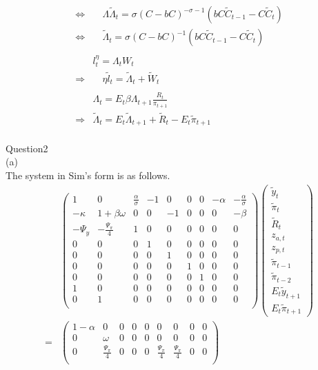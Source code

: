 \documentclass{article}
\begin{document}
\begin{CJK}{UTF8}{min}
\begin{align*}
    \Leftrightarrow & \quad \Lambda \tilde{\Lambda}_t=\sigma(C-bC)^{-\sigma-1}(bC\tilde{C}_{t-1}-C\tilde{C}_t) \\
    \Leftrightarrow & \quad \tilde{\Lambda}_t=\sigma(C-bC)^{-1}(bC\tilde{C}_{t-1}-C\tilde{C}_t) \\\\
    &l^\eta_{t}=\Lambda_{t}W_{t} \\
    \Rightarrow & \quad \eta\tilde{l}_t=\tilde{\Lambda}_t+\tilde{W}_t \\\\
    &\Lambda_{t}=E_t\beta\Lambda_{t+1}\frac{R_t}{\pi_{t+1}} \\
    \Rightarrow & \tilde\Lambda_t=E_t\tilde\Lambda_{t+1}+\tilde R_t-E_t\tilde \pi_{t+1}
\end{align*}\\
\qquad Question2\\
(a)\\
The system in Sim's form is as follows.
\begin{align*}
&\begin{pmatrix}1&0&\frac{\alpha}{\sigma}&-1&0&0&0&-\alpha&-\frac{\alpha}{\sigma}\\
-\kappa&1+\beta\omega&0&0&-1&0&0&0&-\beta\\
-\Psi_y&-\frac{\Psi_\pi}{4}&1&0&0&0&0&0&0\\
0&0&0&1&0&0&0&0&0\\
0&0&0&0&1&0&0&0&0\\
0&0&0&0&0&1&0&0&0\\
0&0&0&0&0&0&1&0&0\\
1&0&0&0&0&0&0&0&0\\
0&1&0&0&0&0&0&0&0\\
\end{pmatrix}
\begin{pmatrix}
\tilde y_t\\
\tilde \pi_t\\
\tilde R_t\\
z_{a,t}\\
z_{p,t}\\
\tilde \pi_{t-1}\\
\tilde \pi_{t-2}\\
E_t\tilde y_{t+1}\\
E_t\tilde \pi_{t+1}
\end{pmatrix}\\=
&\begin{pmatrix}
1-\alpha&0&0&0&0&0&0&0&0\\
0&\omega&0&0&0&0&0&0&0\\
0&\frac{\Psi_\pi}{4}&0&0&0&\frac{\Psi_\pi}{4}&\frac{\Psi_\pi}{4}&0&0\\

\end{pmatrix}
\end{align*}
\end{CJK}
\end{document}
